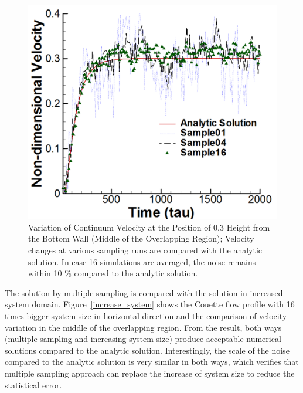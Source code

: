 \documentclass[preprint,12pt]{elsarticle}
\begin{document}
\begin{figure}
\centering
\includegraphics[width=0.6\linewidth]{Couette_025_Temporal_Multiset.pdf}
\vskip-0.2cm
\caption{\small Variation of Continuum Velocity at the Position of 0.3 Height from the Bottom Wall (Middle of the Overlapping Region); Velocity changes at various sampling runs are compared with the analytic solution. In case 16 simulations are averaged, the noise remains within 10 $\%$ compared to the analytic solution.}
\label{multiple_couette_temporal}
\end{figure}


The solution by multiple sampling is compared with the solution in increased system domain. Figure~\ref{increase_system} shows the Couette flow profile with 16 times bigger system size in horizontal direction and the comparison of velocity variation in the middle of the overlapping region. From the result, both ways (multiple sampling and increasing system size) produce acceptable numerical solutions compared to the analytic solution. Interestingly, the scale of the noise compared to the analytic solution is very similar in both ways, which verifies that multiple sampling approach can replace the increase of system size to reduce the statistical error.
\end{document}
